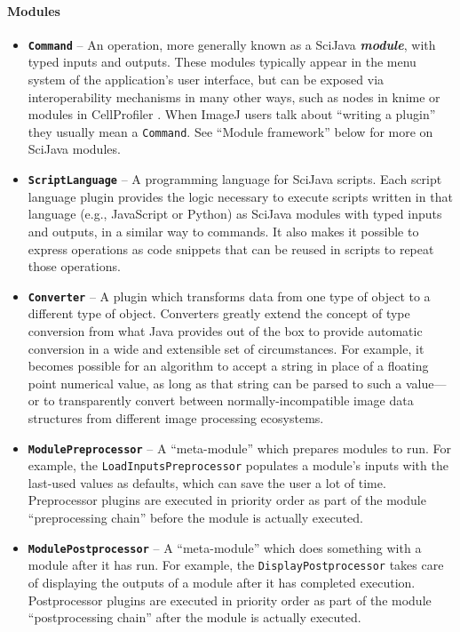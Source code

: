 \documentclass{bmcart}
\begin{document}
\paragraph*{Modules}
\begin{itemize}
  \item \textbf{\texttt{Command}} -- An operation, more generally known as a
    SciJava \textbf{\textit{module}}, with typed inputs and outputs. These
    modules typically appear in the menu system of the application's user
    interface, but can be exposed via interoperability mechanisms in many other
    ways, such as nodes in \acrshort{knime} or modules in CellProfiler
    \cite{cellprofiler}. When ImageJ users talk about ``writing a plugin'' they
    usually mean a \texttt{Command}. See ``Module framework'' below for more on
    SciJava modules.
  \item \textbf{\texttt{ScriptLanguage}} -- A programming language for SciJava
    scripts. Each script language plugin provides the logic necessary to
    execute scripts written in that language (e.g., JavaScript or Python) as
    SciJava modules with typed inputs and outputs, in a similar way to
    commands. It also makes it possible to express operations as code snippets
    that can be reused in scripts to repeat those operations.
  \item \textbf{\texttt{Converter}} -- A plugin which transforms data from one
    type of object to a different type of object. Converters greatly extend the
    concept of type conversion from what Java provides out of the box to
    provide automatic conversion in a wide and extensible set of circumstances.
    For example, it becomes possible for an algorithm to accept a string in
    place of a floating point numerical value, as long as that string can be
    parsed to such a value---or to transparently convert between
    normally-incompatible image data structures from different image processing
    ecosystems.
  \item \textbf{\texttt{ModulePreprocessor}} -- A ``meta-module'' which
    prepares modules to run. For example, the \texttt{LoadInputsPreprocessor}
    populates a module's inputs with the last-used values as defaults, which
    can save the user a lot of time. Preprocessor plugins are executed in
    priority order as part of the module ``preprocessing chain'' before the
    module is actually executed.
  \item \textbf{\texttt{ModulePostprocessor}} -- A ``meta-module'' which does
    something with a module after it has run. For example, the
    \texttt{DisplayPostprocessor} takes care of displaying the outputs of a
    module after it has completed execution. Postprocessor plugins are executed
    in priority order as part of the module ``postprocessing chain'' after the
    module is actually executed.
\end{itemize}
\end{document}
